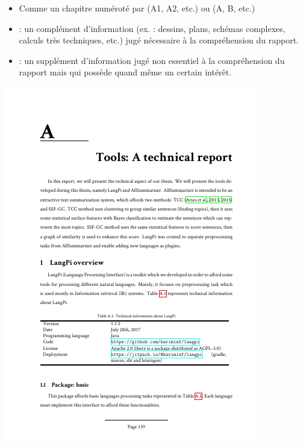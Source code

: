 \documentclass[xcolor=table]{beamer}
\begin{document}
\begin{frame}
\begin{minipage}{0.60\textwidth}
	\begin{itemize}
		\item Comme un chapitre numéroté par (A1, A2, etc.) ou (A, B, etc.)
		\item {} : un complément d'information (ex. : dessins, plans, schémas complexes, calculs très techniques, etc.) jugé nécessaire à la compréhension du rapport.
		\item {} : un supplément d'information jugé non essentiel à la compréhension du rapport mais qui possède quand même un certain intérêt.
	\end{itemize}
\end{minipage}
\begin{minipage}{0.38\textwidth}
	\includegraphics[width=\textwidth,frame]{..//img/Bweb03-redaction/annex.png}
\end{minipage}

\end{frame}
\end{document}
